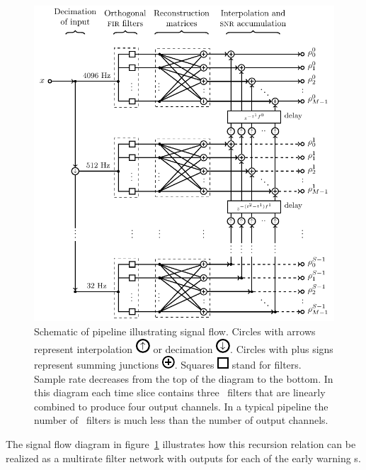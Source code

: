 \begin{figure}[htbp]
	\includegraphics{figures/lloid-diagram.pdf}
	\caption{\label{fig:pipeline} Schematic of \lloid{} pipeline illustrating
signal flow.  Circles with arrows represent interpolation
\protect\includegraphics{figures/upsample-symbol.pdf} or decimation
\protect\includegraphics{figures/downsample-symbol.pdf}.  Circles with plus
signs represent summing junctions
\protect\includegraphics{figures/adder-symbol.pdf}.  Squares
\protect\includegraphics{figures/fir-symbol.pdf} stand for \fir{} filters.  Sample
rate decreases from the top of the diagram to the bottom.  In this diagram each
time slice contains three \fir\ filters that are linearly combined to produce
four output channels.  In a typical pipeline the number of \fir\ filters is
much less than the number of output channels.}
\end{figure}
%
%
The signal flow diagram in figure~\ref{fig:pipeline} illustrates how this
recursion relation can be realized as a multirate filter network with outputs for
each of the early warning \SNR{}s.

